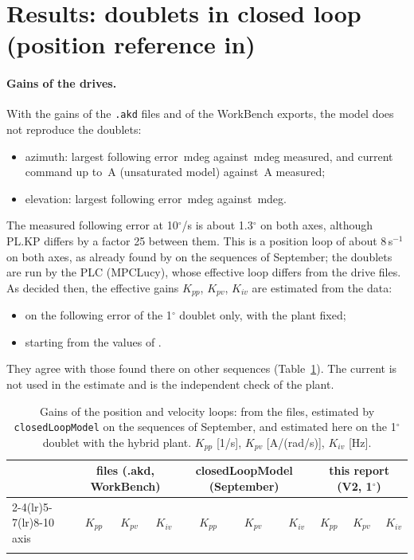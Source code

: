 \documentclass[10pt,a4paper]{article}
\numberwithin{equation}{section}
\begin{document}
\section{Results: doublets in closed loop (position reference in)}\label{sec:res_cl}
\paragraph{Gains of the drives.} With the gains of the \texttt{.akd} files and of the WorkBench exports, the model does not reproduce the doublets:
\begin{itemize}
\item azimuth: largest following error \akdErrA\,mdeg against \akdErrMeasA\,mdeg measured, and current command up to \akdImaxA\,A (unsaturated model) against \akdImaxMeasA\,A measured;
\item elevation: largest following error \akdErrP\,mdeg against \akdErrMeasP\,mdeg.
\end{itemize}
The measured following error at 10$^\circ$/s is about 1.3$^\circ$ on both axes, although PL.KP differs by a factor 25 between them. This is a position loop of about 8\,s$^{-1}$ on both axes, as already found by  on the sequences of September; the doublets are run by the PLC (MPCLucy), whose effective loop differs from the drive files. As decided then, the effective gains $K_{pp}$, $K_{pv}$, $K_{iv}$ are estimated from the data:
\begin{itemize}
\item on the following error of the 1$^\circ$ doublet only, with the plant fixed;
\item starting from the values of .
\end{itemize}
They agree with those found there on other sequences (Table~\ref{tab:gains}). The current is not used in the estimate and is the independent check of the plant.

\begin{table}[H]\centering\footnotesize\setlength{\tabcolsep}{4pt}
\caption{Gains of the position and velocity loops: from the files, estimated by \texttt{closedLoopModel} on the sequences of September, and estimated here on the 1$^\circ$ doublet with the hybrid plant. $K_{pp}$ [1/s], $K_{pv}$ [A/(rad/s)], $K_{iv}$ [Hz].}\label{tab:gains}
\begin{tabular}{lrrrrrrrrr}\toprule
& \multicolumn{3}{c}{files (.akd, WorkBench)} & \multicolumn{3}{c}{closedLoopModel (September)} & \multicolumn{3}{c}{this report (V2, 1$^\circ$)} \\
\cmidrule(lr){2-4}\cmidrule(lr){5-7}\cmidrule(lr){8-10}
axis & $K_{pp}$ & $K_{pv}$ & $K_{iv}$ & $K_{pp}$ & $K_{pv}$ & $K_{iv}$ & $K_{pp}$ & $K_{pv}$ & $K_{iv}$ \\ \midrule
\\ \bottomrule
\end{tabular}\end{table}
\end{document}
